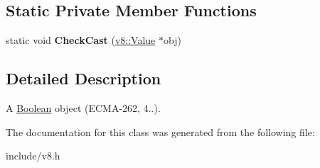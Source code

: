 \subsection*{Static Private Member Functions}
\begin{DoxyCompactItemize}
\item 
static void {\bfseries Check\+Cast} (\hyperlink{classv8_1_1_value}{v8\+::\+Value} $\ast$obj)\hypertarget{classv8_1_1_boolean_object_a733e238e5e918f3135966ee30941eee3}{}\label{classv8_1_1_boolean_object_a733e238e5e918f3135966ee30941eee3}

\end{DoxyCompactItemize}


\subsection{Detailed Description}
A \hyperlink{classv8_1_1_boolean}{Boolean} object (E\+C\+M\+A-\/262, 4..). 

The documentation for this class was generated from the following file\+:\begin{DoxyCompactItemize}
\item 
include/v8.\+h\end{DoxyCompactItemize}
